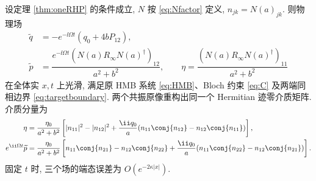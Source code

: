 \begin{theorem}[单轨道三场解]\label{thm:direct-HMB}\label{prop:oneboundary}
设定理 \ref{thm:oneRHP} 的条件成立, $N$ 按 \eqref{eq:Nfactor} 定义, $n_{jk}=N(a)_{jk}$. 则物理场
\begin{equation}\label{eq:finalfields}
\begin{aligned}
\widetilde q&=-e^{-\ii\Omega t}(q_0+4bP_{12}),\\
\widetilde p&=\dfrac{e^{-\ii\Omega t}(N(a)R_\infty N(a)^\dagger)_{12}}{a^2+b^2},\qquad
\eta=\dfrac{(N(a)R_\infty N(a)^\dagger)_{11}}{a^2+b^2}
\end{aligned}
\end{equation}
在全体实 $x,t$ 上光滑, 满足原 HMB 系统 \eqref{eq:HMB}、Bloch 约束 \eqref{eq:C} 及两端同相边界 \eqref{eq:targetboundary}. 两个共振原像重构出同一个 Hermitian 迹零介质矩阵. 介质分量为
\begin{align}
\eta&=\dfrac{\eta_0}{a^2+b^2}\left[|n_{11}|^2-|n_{12}|^2
+\dfrac{\ii q_0}{a}(n_{11}\conj{n_{12}}-n_{12}\conj{n_{11}})\right],\label{eq:etacomponent}\\
e^{\ii\Omega t}\widetilde p&=\dfrac{\eta_0}{a^2+b^2}\left[n_{11}\conj{n_{21}}-n_{12}\conj{n_{22}}
+\dfrac{\ii q_0}{a}(n_{11}\conj{n_{22}}-n_{12}\conj{n_{21}})\right].\label{eq:pcomponent}
\end{align}
固定 $t$ 时, 三个场的端态误差为 $O(e^{-2\kappa|x|})$.
\end{theorem}
